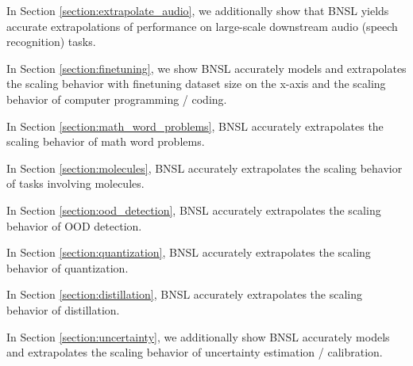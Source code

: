 \documentclass{article} %
\begin{document}
In Section \ref{section:extrapolate_audio}, we additionally show that BNSL yields accurate extrapolations of performance on large-scale downstream audio (speech recognition) tasks.

\vspace{-2.1mm}

In Section \ref{section:finetuning}, we show BNSL accurately models and extrapolates the scaling behavior with finetuning dataset size on the x-axis and the scaling behavior of computer programming / coding.

\vspace{-2.1mm}

In Section \ref{section:math_word_problems}, BNSL accurately extrapolates the scaling behavior of math word problems.

\vspace{-2.1mm}

In Section \ref{section:molecules}, BNSL accurately extrapolates the scaling behavior of tasks involving molecules.

\vspace{-2.1mm}

In Section \ref{section:ood_detection}, BNSL accurately extrapolates the scaling behavior of OOD detection.

\vspace{-2.1mm}

In Section \ref{section:quantization}, BNSL accurately extrapolates the scaling behavior of quantization.

\vspace{-2.1mm}

In Section \ref{section:distillation}, BNSL accurately extrapolates the scaling behavior of distillation.

\vspace{-2.1mm}

In Section \ref{section:uncertainty}, we additionally show BNSL accurately models and extrapolates the scaling behavior of uncertainty estimation / calibration.

\vspace{-4.0mm}


\iffalse
\end{document}
